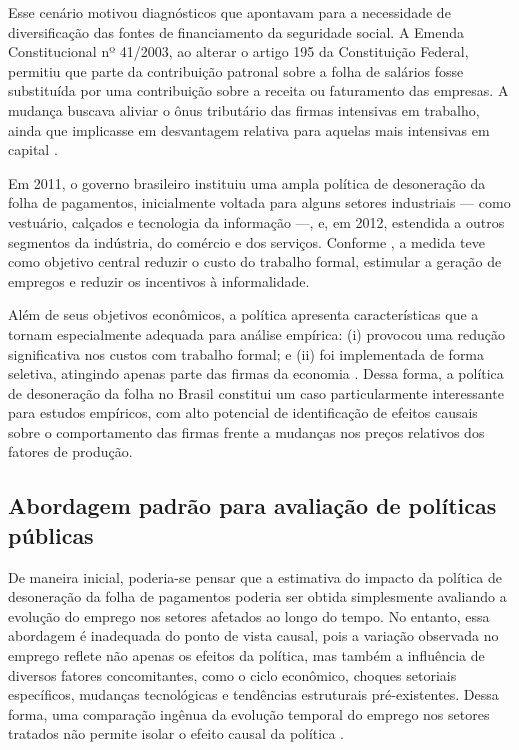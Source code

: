 \documentclass[12pt,a4paper,oneside]{article}
\begin{document}
		Esse cenário motivou diagnósticos que apontavam para a necessidade de diversificação das fontes de financiamento da seguridade social. A Emenda Constitucional nº 41/2003, ao alterar o artigo 195 da Constituição Federal, permitiu que parte da contribuição patronal sobre a folha de salários fosse substituída por uma contribuição sobre a receita ou faturamento das empresas. A mudança buscava aliviar o ônus tributário das firmas intensivas em trabalho, ainda que implicasse em desvantagem relativa para aquelas mais intensivas em capital \citep{ansiliero2008}.
		
		Em 2011, o governo brasileiro instituiu uma ampla política de desoneração da folha de pagamentos, inicialmente voltada para alguns setores industriais — como vestuário, calçados e tecnologia da informação —, e, em 2012, estendida a outros segmentos da indústria, do comércio e dos serviços. Conforme \citet{Scherer2015}, a medida teve como objetivo central reduzir o custo do trabalho formal, estimular a geração de empregos e reduzir os incentivos à informalidade.
		
		Além de seus objetivos econômicos, a política apresenta características que a tornam especialmente adequada para análise empírica: (i) provocou uma redução significativa nos custos com trabalho formal; e (ii) foi implementada de forma seletiva, atingindo apenas parte das firmas da economia \citep{Scherer2015}. Dessa forma, a política de desoneração da folha no Brasil constitui um caso particularmente interessante para estudos empíricos, com alto potencial de identificação de efeitos causais sobre o comportamento das firmas frente a mudanças nos preços relativos dos fatores de produção.
		
				
		


		\subsection{Abordagem padrão para avaliação de políticas públicas}
		
		De maneira inicial, poderia-se pensar que a estimativa do impacto da política de desoneração da folha de pagamentos poderia ser obtida simplesmente avaliando a evolução do emprego nos setores afetados ao longo do tempo. No entanto, essa abordagem é inadequada do ponto de vista causal, pois a variação observada no emprego reflete não apenas os efeitos da política, mas também a influência de diversos fatores concomitantes, como o ciclo econômico, choques setoriais específicos, mudanças tecnológicas e tendências estruturais pré-existentes. Dessa forma, uma comparação ingênua da evolução temporal do emprego nos setores tratados não permite isolar o efeito causal da política \citep{angrist2009}.
		
\end{document}
